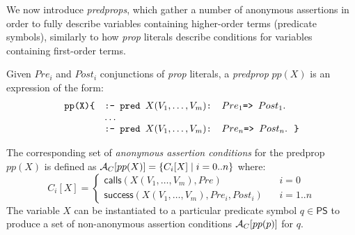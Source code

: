 \documentclass{llncs}
\newcommand{\PS}{\textsf{PS}}
\newcommand{\AC}
  {\ensuremath{{\cal A}_{C}}}
\newcommand{\ACpp}[1]
  {\ensuremath{\AC[#1]}}
\newcommand{\kbd}[1]{\mbox{\tt #1}}
\newcommand{\callsAsr}[2]{\ensuremath{\textsf{calls}(#1, #2)}}
\newcommand{\successAsr}[3]{\ensuremath{\textsf{success}(#1, #2, #3)}}
\begin{document}
We now introduce \emph{predprops}, which 
gather a number of anonymous assertions in order to fully describe
variables containing higher-order terms (predicate symbols), similarly
to how \emph{prop} literals describe conditions for variables
containing first-order terms. 

\begin{definition}[Predprop]
  \label{def:pp-literal}
  Given $Pre_i$ and $Post_i$ conjunctions of \emph{prop} literals, a
  \emph{predprop} $pp(X)$ is an expression of the form:
  \[
  \begin{array}{ll}
    \kbd{pp(X)}  \kbd{\{}    
  & 
    \kbd{:- pred } X(V_1,\ldots,V_m)
    \kbd{ : } Pre_1 \kbd{ => } Post_1.
  \\ 
  & 
       \ldots
  \\
  & 
    \kbd{:- pred } X(V_1,\ldots,V_m)
    \kbd{ : } Pre_n \kbd{ => } Post_n. ~~\kbd{\}}
  \end{array}
  \]
\end{definition}

\begin{definition}
  \label{def:assrts-mapping}
  The corresponding set of \emph{anonymous assertion conditions}
  for the predprop $pp(X)$ is defined as 
  $\ACpp{pp(X)} = \{C_i[X]\;|\;i=0..n\}$ where:
  \[
    C_i[X] = \left\{
    \begin{array}{ll}
      \callsAsr{X(V_1,\ldots,V_m)}{Pre} 
    & ~~~~i = 0 
    \\
      \successAsr{X(V_1,\ldots,V_m)}{Pre_i}{Post_i}   
    & ~~~~i = 1..n
    \end{array}
    \right.
  \]
The variable $X$ can be instantiated to a particular predicate
  symbol $q \in \PS$ to produce a set of non-anonymous assertion
  conditions $\ACpp{pp(p)}$ for $q$.
\end{definition}
\end{document}
